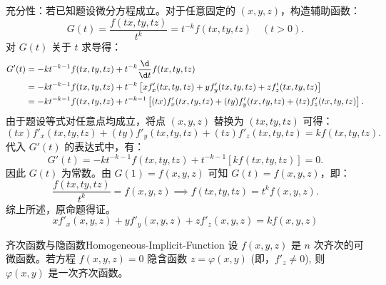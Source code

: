 \begin{myproof}
    充分性：若已知题设微分方程成立。对于任意固定的 $(x, y, z)$，构造辅助函数：
    \begin{equation}
        G(t) = \frac{f(tx, ty, tz)}{t^k} = t^{-k} f(tx, ty, tz) \quad (t > 0).
    \end{equation}
    对 $G(t)$ 关于 $t$ 求导得：
    \begin{equation}
        \begin{aligned}
            G'(t) & = -k t^{-k-1} f(tx, ty, tz) + t^{-k} \frac{\d}{\d t} f(tx, ty, tz)                                                           \\
                  & = -k t^{-k-1} f(tx, ty, tz) + t^{-k} \left[ x f'_x(tx, ty, tz) + y f'_y(tx, ty, tz) + z f'_z(tx, ty, tz) \right]             \\
                  & = -k t^{-k-1} f(tx, ty, tz) + t^{-k-1} \left[ (tx) f'_x(tx, ty, tz) + (ty) f'_y(tx, ty, tz) + (tz) f'_z(tx, ty, tz) \right].
        \end{aligned}
    \end{equation}
    由于题设等式对任意点均成立，将点 $(x, y, z)$ 替换为 $(tx, ty, tz)$ 可得：
    \begin{equation}
        (tx) f'_x(tx, ty, tz) + (ty) f'_y(tx, ty, tz) + (tz) f'_z(tx, ty, tz) = k f(tx, ty, tz).
    \end{equation}
    代入 $G'(t)$ 的表达式中，有：
    \begin{equation}
        G'(t) = -k t^{-k-1} f(tx, ty, tz) + t^{-k-1} \left[ k f(tx, ty, tz) \right] = 0.
    \end{equation}
    因此 $G(t)$ 为常数。由 $G(1) = f(x, y, z)$ 可知 $G(t) = f(x, y, z)$，即：
    \begin{equation}
        \frac{f(tx, ty, tz)}{t^k} = f(x, y, z) \implies f(tx, ty, tz) = t^k f(x, y, z).
    \end{equation}
    综上所述，原命题得证。
    \begin{equation}
        \boxed{x f'_x(x, y, z) + y f'_y(x, y, z) + z f'_z(x, y, z) = k f(x, y, z)}
    \end{equation}
\end{myproof}


\begin{problem}{齐次函数与隐函数}{Homogeneous-Implicit-Function}
    设 $f(x,y,z)$ 是 $n$ 次齐次的可微函数。若方程 $f(x,y,z) = 0$ 隐含函数 $z = \varphi(x,y)$ (即，$f'_z \neq 0$), 则 $\varphi(x,y)$ 是一次齐次函数。
\end{problem}

